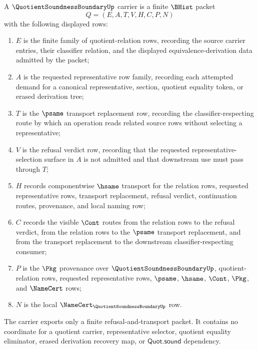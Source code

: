\begin{definition}
\label{def:quotient-soundness-boundary-carrier}
A $\QuotientSoundnessBoundaryUp$ carrier is a finite $\BHist$ packet
$$
Q=(E,A,T,V,H,C,P,N)
$$
with the following displayed rows:
\begin{enumerate}
\item $E$ is the finite family of quotient-relation rows, recording the source carrier entries, their classifier relation, and the displayed equivalence-derivation data admitted by the packet;
\item $A$ is the requested representative row family, recording each attempted demand for a canonical representative, section, quotient equality token, or erased derivation tree;
\item $T$ is the $\psame$ transport replacement row, recording the classifier-respecting route by which an operation reads related source rows without selecting a representative;
\item $V$ is the refusal verdict row, recording that the requested representative-selection surface in $A$ is not admitted and that downstream use must pass through $T$;
\item $H$ records componentwise $\hsame$ transport for the relation rows, requested representative rows, transport replacement, refusal verdict, continuation routes, provenance, and local naming row;
\item $C$ records the visible $\Cont$ routes from the relation rows to the refusal verdict, from the relation rows to the $\psame$ transport replacement, and from the transport replacement to the downstream classifier-respecting consumer;
\item $P$ is the $\Pkg$ provenance over $\QuotientSoundnessBoundaryUp$, quotient-relation rows, requested representative rows, $\psame$, $\hsame$, $\Cont$, $\Pkg$, and $\NameCert$ rows;
\item $N$ is the local $\NameCert_{\QuotientSoundnessBoundaryUp}$ row.
\end{enumerate}
The carrier exports only a finite refusal-and-transport packet. It contains no coordinate for a quotient carrier, representative selector, quotient equality eliminator, erased derivation recovery map, or $\mathsf{Quot.sound}$ dependency.
\end{definition}

